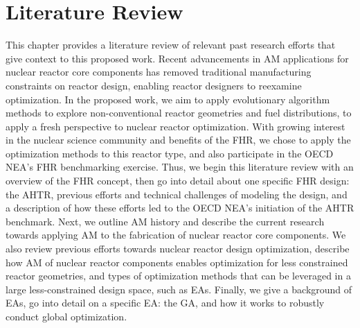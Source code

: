 \chapter{Literature Review}
\label{chap:lit-review}

This chapter provides a literature review of relevant past research efforts 
that give context to this proposed work.
Recent advancements in \gls{AM} applications for nuclear reactor core 
components has removed traditional manufacturing constraints on reactor design, 
enabling reactor designers to reexamine optimization.
In the proposed work, we aim to apply evolutionary algorithm methods to explore 
non-conventional reactor geometries and fuel distributions, to apply a fresh 
perspective to nuclear reactor optimization. 
With growing interest in the nuclear science community and benefits of the 
\gls{FHR}, we chose to apply the optimization methods to this reactor type, 
and also participate in the \gls{OECD} \gls{NEA}'s \gls{FHR} benchmarking exercise. 
Thus, we begin this literature review with an overview of the \gls{FHR} concept, 
then go into detail about one specific \gls{FHR} design: the \gls{AHTR}, 
previous efforts and technical challenges of modeling the design, and a 
description of how these efforts led to the \gls{OECD} \gls{NEA}'s initiation of 
the \gls{AHTR} benchmark.
Next, we outline \gls{AM} history and describe the current research towards applying 
\gls{AM} to the fabrication of nuclear reactor core components. 
We also review previous efforts towards nuclear reactor design optimization, 
describe how \gls{AM} of nuclear reactor components enables optimization for 
less constrained reactor geometries, and types of optimization methods that can be 
leveraged in a large less-constrained design space, such as \glspl{EA}.  
Finally, we give a background of \glspl{EA}, go into detail on a 
specific \gls{EA}: the \gls{GA}, and how it works to robustly conduct global 
optimization. 

